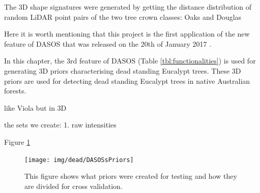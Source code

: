 \documentclass{subfiles}
\begin{document}
\par The 3D shape signatures were generated by getting the distance distribution of random LiDAR point pairs of the two tree crown classes: Oaks and Douglas \cite{Dong2009}

\par Here it is worth mentioning that this project is the first application of the new feature of DASOS that was released on the 20th of January 2017 \cite{DASOS_v2}. 

\par In this chapter, the 3rd feature of DASOS (Table \ref{tbl:functionalities}) is used for generating 3D priors characterising dead standing Eucalypt trees. These 3D priors are used for detecting dead standing Eucalypt trees in native Australian forests. 


\par like Viola but in 3D 

\par the sets we create: 1. raw intensities 

\par Figure \ref{fig:DASOSsPriors}


 \begin{figure} [h!]
	\centering
	\texttt{[image: img/dead/DASOSsPriors]}
	\caption{This figure shows what priors were created for testing and how they are divided for cross validation.}
	\label{fig:DASOSsPriors}
\end{figure}
\end{document}
